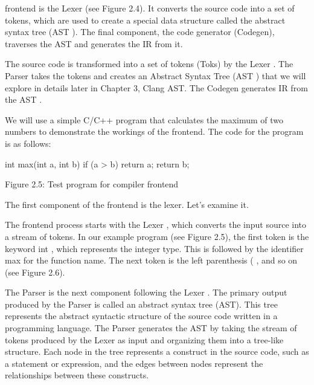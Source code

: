 frontend is the Lexer (see Figure 2.4). It converts the source code into a set of tokens, which are used to create a special data structure called the abstract syntax tree (AST ). The final component, the code generator (Codegen), traverses the AST and generates the IR from it.


The source code is transformed into a set of tokens (Toks) by the Lexer . The Parser takes the tokens and creates an Abstract Syntax Tree (AST ) that we will explore in details later in Chapter 3, Clang AST. The Codegen generates IR from the AST .

We will use a simple C/C++ program that calculates the maximum of two numbers to demonstrate the workings of the frontend. The code for the program is as follows:

\begin{cpp}
int max(int a, int b) {
  if (a > b)
    return a;
  return b;
}
\end{cpp}

\begin{center}
Figure 2.5: Test program for compiler frontend
\end{center}

The first component of the frontend is the lexer. Let's examine it.


The frontend process starts with the Lexer , which converts the input source into a stream of tokens. In our example program (see Figure 2.5), the first token is the keyword int , which represents the integer type. This is followed by the identifier max for the function name. The next token is the left parenthesis ( , and so on (see Figure 2.6).



The Parser is the next component following the Lexer . The primary output produced by the Parser is called an abstract syntax tree (AST). This tree represents the abstract syntactic structure of the source code written in a programming language. The Parser generates the AST by taking the stream of tokens produced by the Lexer as input and organizing them into a tree-like structure. Each node in the tree represents a construct in the source code, such as a statement or expression, and the edges between nodes represent the relationships between these constructs.

